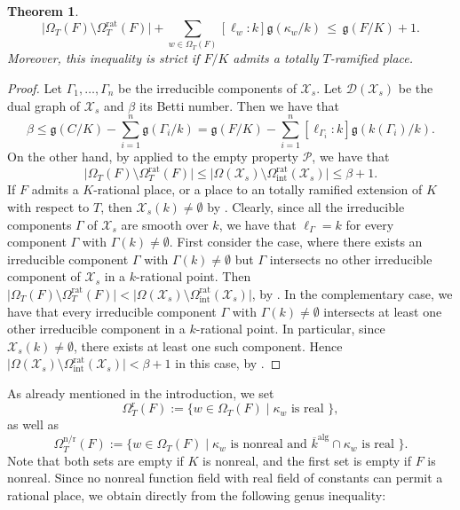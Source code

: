 \documentclass[a4paper,12pt,reqno]{amsart}
\newcommand\mc\mathcal
\newtheorem{thm}{Theorem}[section]
\theoremstyle{definition}
\numberwithin{equation}{thm}
\renewcommand{\leq}{\leqslant}
\begin{document}
\begin{thm}\label{rational-genus-inequality}
 $$\vert \Omega_{T}(F) \setminus \Omega^{\mathrm{rat}}_T(F) \vert + \sum_{w \in \Omega_T(F)} [\ell_w:k] \mathfrak{g}(\kappa_w/k)  \, \leq \, \mathfrak{g}(F/K) +1.$$
 Moreover, this inequality is strict if $F/K$ admits a totally $T$-ramified place.
\end{thm}
\begin{proof}
 Let $\Gamma_1, \ldots, \Gamma_n$ be the irreducible components of $\mc{X}_s$. Let $\mc{D}(\mc{X}_s)$ be the dual graph of $\mc{X}_s$ and $\beta$ its Betti number. Then we have that 
$$\beta \leq \mathfrak{g}(C/K) - \sum_{i=1}^n \mathfrak{g}(\Gamma_i/k)=\mathfrak{g}(F/K) - \sum_{i=1}^n [\ell_{\Gamma_i}:k] \mathfrak{g}(k(\Gamma_i)/k).$$
On the other hand, by  applied to the empty property $\mathcal{P}$, we have that $$ \vert \Omega_{T}(F)  \setminus \Omega^{\mathrm{rat}}_{T}(F)  \vert \leq  \vert \Omega(\mc{X}_s) \setminus \Omega^\mathrm{rat}_{\mathrm{int}}(\mc{X}_s) \vert \leq \beta + 1.$$
If $F$ admits a $K$-rational place, or a place to an totally ramified extension of $K$ with respect to $T$, then $\mc{X}_s(k) \neq \emptyset$ by .  Clearly, since all the irreducible components $\Gamma$ of $\mc{X}_s$ are smooth over $k$, we have that $\ell_\Gamma=k$ for every component $\Gamma$ with $\Gamma(k) \neq \emptyset$.
First consider the case, where there exists an irreducible component $\Gamma$ with $\Gamma(k)\neq \emptyset$ but $\Gamma$ intersects no other irreducible component of $\mc{X}_s$ in a $k$-rational point. Then $ \vert \Omega_T(F)  \setminus \Omega^{\mathrm{rat}}_T(F)  \vert <  \vert \Omega(\mc{X}_s) \setminus \Omega^\mathrm{rat}_{\mathrm{int}}(\mc{X}_s) \vert $, by .  
In the complementary case, we have that every irreducible component $\Gamma$ with $\Gamma(k) \neq \emptyset$ intersects at least one other irreducible component in a $k$-rational point. In particular, since $\mc{X}_s(k) \neq \emptyset$, there exists at least one such component.
Hence $\vert \Omega(\mc{X}_s) \setminus \Omega^\mathrm{rat}_{\mathrm{int}}(\mc{X}_s) \vert < \beta + 1$ in this case,  by .
\end{proof}

As already mentioned in the introduction, we set
$$\Omega^{\text{r}}_T(F):=\{w \in \Omega_T(F) \mid \kappa_w \text{ is  real }\},$$
as well as $$ \Omega^{\text{n/r}}_T(F):=\{w \in \Omega_T(F) \mid \kappa_w \text{ is nonreal and }  \overline{k}^{\mathrm{alg}} \cap \kappa_w  \text{ is real }\}.$$ 
Note that both sets are empty if $K$ is nonreal, and the first set is empty if $F$ is nonreal.
Since no nonreal function field with real field of constants can permit a rational place,  we obtain directly from  the following genus inequality:
\end{document}
